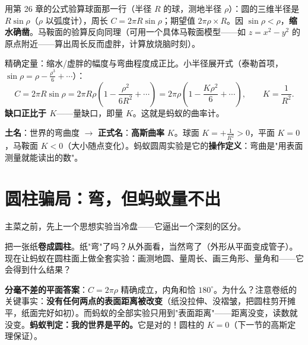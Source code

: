 
用第 26 章的公式验算球面那一行（半径 $R$ 的球，测地半径 $\rho$）：圆的三维半径是 $R\sin\rho$（$\rho$ 以弧度计），周长 $C = 2\pi R\sin\rho$；期望值 $2\pi\rho\times R$。因 $\sin\rho < \rho$，\textbf{缩水确凿}。马鞍面的验算反向同理（可用一个具体马鞍面模型——如 $z = x^2 - y^2$ 的原点附近——算出周长反而虚胖，计算放烧脑时刻）。

精确定量：缩水/虚胖的幅度与弯曲程度成正比。小半径展开式（泰勒首项，$\sin\rho = \rho - \tfrac{\rho^3}{6} + \cdots$）：
\[
C = 2\pi R\sin\rho = 2\pi R\rho\left(1 - \frac{\rho^2}{6R^2} + \cdots\right) = 2\pi\rho\left(1 - \frac{K\rho^2}{6} + \cdots\right),
\qquad K = \frac{1}{R^2}.
\]
\textbf{缺口正比于 $K$}——量缺口，即量 $K$。这就是蚂蚁的曲率计。

\begin{faming}
\textbf{土名}：世界的弯曲度 $\to$ \textbf{正式名}：\textbf{高斯曲率} $K$。球面 $K = +\tfrac1{R^2} > 0$，平面 $K = 0$，马鞍面 $K < 0$（大小随点变化）。蚂蚁圆周实验是它的\textbf{操作定义}：弯曲是"用表面测量就能读出的数"。
\end{faming}

\section{圆柱骗局：弯，但蚂蚁量不出}

主菜之前，先上一个思想实验当冷盘——它逼出一个深刻的区分。

把一张纸\textbf{卷成圆柱}。纸"弯"了吗？从外面看，当然弯了（外形从平面变成管子）。现在让蚂蚁在圆柱面上做全套实验：画测地圆、量周长、画三角形、量角和——它会得到什么结果？

\textbf{分毫不差的平面答案}：$C = 2\pi\rho$ 精确成立，内角和恰 $180^\circ$。为什么？注意卷纸的关键事实：\textbf{没有任何两点的表面距离被改变}（纸没拉伸、没褶皱，把圆柱剪开摊平，纸面完好如初）。而蚂蚁的全部实验只用到"表面距离"——距离没变，读数就没变。\textbf{蚂蚁判定：我的世界是平的。}它是对的！圆柱的 $K = 0$（下一节的高斯定理保证）。

